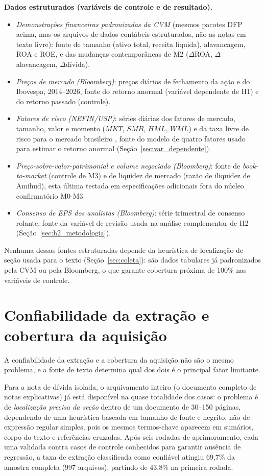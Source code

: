 \documentclass[a4paper,12pt]{report}
\begin{document}
\textbf{Dados estruturados (variáveis de controle e de resultado).}
\begin{itemize}
    \item \textit{Demonstrações financeiras padronizadas da CVM} (mesmos pacotes DFP acima, mas os arquivos de dados contábeis estruturados, não as notas em texto livre): fonte de tamanho (ativo total, receita líquida), alavancagem, ROA e ROE, e das mudanças contemporâneas de M2 ($\Delta$ROA, $\Delta$alavancagem, $\Delta$dívida).
    \item \textit{Preços de mercado (Bloomberg)}: preços diários de fechamento da ação e do Ibovespa, 2014--2026, fonte do retorno anormal (variável dependente de H1) e do retorno passado (controle).
    \item \textit{Fatores de risco (NEFIN/USP)}: séries diárias dos fatores de mercado, tamanho, valor e momento ($\mathit{MKT}$, $\mathit{SMB}$, $\mathit{HML}$, $\mathit{WML}$) e da taxa livre de risco para o mercado brasileiro \cite{nefin2026}, fonte do modelo de quatro fatores usado para estimar o retorno anormal (Seção~\ref{sec:var_dependente}).
    \item \textit{Preço-sobre-valor-patrimonial e volume negociado (Bloomberg)}: fonte de \textit{book-to-market} (controle de M3) e de liquidez de mercado (razão de iliquidez de Amihud), esta última testada em especificações adicionais fora do núcleo confirmatório M0-M3.
    \item \textit{Consenso de EPS dos analistas (Bloomberg)}: série trimestral de consenso rolante, fonte da variável de revisão usada na análise complementar de H2 (Seção~\ref{sec:h2_metodologia}).
\end{itemize}

Nenhuma dessas fontes estruturadas depende da heurística de localização de seção usada para o texto (Seção~\ref{sec:coleta}): são dados tabulares já padronizados pela CVM ou pela Bloomberg, o que garante cobertura próxima de 100\% nas variáveis de controle.

\section{Confiabilidade da extração e cobertura da aquisição}
\label{sec:confiabilidade}

A confiabilidade da extração e a cobertura da aquisição não são o mesmo problema, e a fonte de texto determina qual dos dois é o principal fator limitante.

Para a nota de dívida isolada, o arquivamento inteiro (o documento completo de notas explicativas) já está disponível na quase totalidade dos casos: o problema é de \textit{localização precisa da seção} dentro de um documento de 30--150 páginas, dependendo de uma heurística baseada em tamanho de fonte e negrito, não de expressão regular simples, pois os mesmos termos-chave aparecem em sumários, corpo do texto e referências cruzadas. Após seis rodadas de aprimoramento, cada uma validada contra casos de controle conhecidos para garantir ausência de regressão, a taxa de extração classificada como confiável atingiu 69,7\% da amostra completa (997 arquivos), partindo de 43,8\% na primeira rodada.
\end{document}
